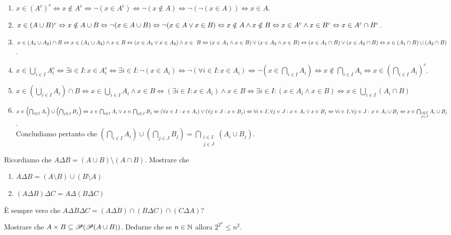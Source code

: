 \documentclass[a4paper]{article}\par \usepackage{style}\par
\begin{document}
\begin{enumerate}
\item $ x \in (A^c)^c \iff x \notin A^c \iff \neg (x \in A^c) \iff \neg (x \notin A) \iff \neg(\neg(x \in A)) \iff x \in A $.
\item $ x \in (A \cup B)^c \iff x \notin A \cup B \iff \neg (x \in A \cup B) \iff \neg(x \in A \vel x \in B) \iff x \notin A \wedge x \notin B \iff x \in A^c \wedge x \in B^c \iff x \in A^c \cap B^c $.
\item $ x \in (A_1 \cup A_2) \cap B \iff x \in (A_1 \cup A_2) \wedge x \in B \iff (x \in A_1 \vel x \in A_2) \wedge x \in~B \iff (x \in A_1 \wedge x \in B) \vel (x \in A_2 \wedge x \in B) \iff (x \in A_1 \cap B) \vel (x \in A_2 \cap B) \iff x \in (A_1 \cap B) \cup (A_2 \cap B) $.
\item $ x \in \bigcup_{i \in I} A_i ^c \iff \exists i \in I : x \in A_i^c \iff \exists i \in I : \neg (x \in A_i) \iff \neg (\forall i \in I : x \in A_i) \iff \neg \left(x \in \bigcap_{i \in I} A_i \right) \iff x \notin \bigcap_{i \in I} A_i \iff x \in \left(\bigcap_{i \in I} A_i \right)^c $.
\item $ x \in \left (\bigcup_{i \in I} A_i \right ) \cap B \iff x \in \bigcup_{i \in I} A_i \wedge x \in B \iff (\exists i \in I : x \in A_i) \wedge x \in B \iff \exists i \in I : (x \in A_i \wedge  x \in B) \iff x \in \bigcup_{i \in I} (A_i \cap B) $
\item $ x \in \left (\bigcap_{i \in I} A_i \right ) \cup \left (\bigcap_{j \in J} B_j \right ) \iff x \in \bigcap_{i \in I} A_i \vel x \in \bigcap_{j \in J} B_j \iff (\forall x \in I : x \in A_i) \vel (\forall j \in J : x \in B_j) \iff \forall i \in I, \forall j \in J : x \in A_i \vel x \in B_j \iff \forall i \in I, \forall j \in J : x \in A_i \cup B_j \iff x \in \bigcap_{\substack{i \in I \\ j \in J}} A_i \cup B_j $. \\
  Concludiamo pertanto che $ \left (\bigcap_{i \in I} A_i \right ) \cup \left (\bigcap_{j \in J} B_j \right ) = \bigcap_{\substack{i \in I \\ j \in J}} (A_i \cup B_j) $.
\end{enumerate}\par \begin{es}
  Ricordiamo che $ A \Delta B = (A \cup B) \setminus (A \cap B) $. Mostrare che
  \begin{enumerate}
  \item $ A \Delta B = (A \setminus B) \cup (B \setminus A) $
  \item $ (A \Delta B) \Delta C = A \Delta (B \Delta C) $
  \end{enumerate}
  È sempre vero che $ A \Delta B \Delta C = (A \Delta B) \cap (B \Delta C) \cap (C \Delta A) $?
\end{es}\par \begin{es}
  Mostrare che $ A \times B \subseteq \P(\P(A \cup B)) $. Dedurne che se $ n \in \N $ allora $ 2^{2^n} \leq n^2 $.
\end{es}
\end{document}
